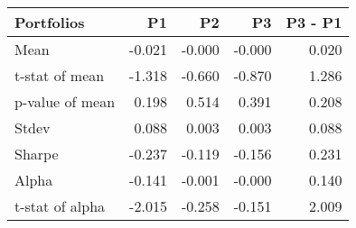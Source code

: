 \begin{tabular}{lrrrr}
\toprule
Portfolios & P1 & P2 & P3 & P3 - P1 \\
\midrule
Mean & -0.021 & -0.000 & -0.000 & 0.020 \\
t-stat of mean & -1.318 & -0.660 & -0.870 & 1.286 \\
p-value of mean & 0.198 & 0.514 & 0.391 & 0.208 \\
Stdev & 0.088 & 0.003 & 0.003 & 0.088 \\
Sharpe & -0.237 & -0.119 & -0.156 & 0.231 \\
Alpha & -0.141 & -0.001 & -0.000 & 0.140 \\
t-stat of alpha & -2.015 & -0.258 & -0.151 & 2.009 \\
\bottomrule
\end{tabular}
